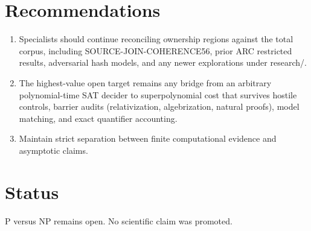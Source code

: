 \documentclass[11pt]{article}
\begin{document}
\section{Recommendations}
\begin{enumerate}
\item Specialists should continue reconciling ownership regions against the total corpus, including SOURCE-JOIN-COHERENCE56, prior ARC restricted results, adversarial hash models, and any newer explorations under research/.
\item The highest-value open target remains any bridge from an arbitrary polynomial-time SAT decider to superpolynomial cost that survives hostile controls, barrier audits (relativization, algebrization, natural proofs), model matching, and exact quantifier accounting.
\item Maintain strict separation between finite computational evidence and asymptotic claims.
\end{enumerate}

\section{Status}
P versus NP remains open. No scientific claim was promoted.

\end{document}
